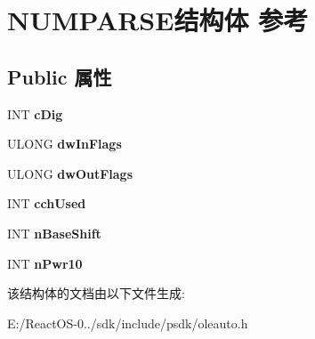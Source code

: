 \hypertarget{struct_n_u_m_p_a_r_s_e}{}\section{N\+U\+M\+P\+A\+R\+S\+E结构体 参考}
\label{struct_n_u_m_p_a_r_s_e}
\subsection*{Public 属性}
\begin{DoxyCompactItemize}
\item 
\mbox{\label{struct_n_u_m_p_a_r_s_e_a18a0067a72a24a10cb0d990ca38d32b3}} 
I\+NT {\bfseries c\+Dig}
\item 
\mbox{\label{struct_n_u_m_p_a_r_s_e_a1546311d2e3bb4151afda63001275095}} 
U\+L\+O\+NG {\bfseries dw\+In\+Flags}
\item 
\mbox{\label{struct_n_u_m_p_a_r_s_e_a3036f270883b0cde2b1e9618ca3a2b4a}} 
U\+L\+O\+NG {\bfseries dw\+Out\+Flags}
\item 
\mbox{\label{struct_n_u_m_p_a_r_s_e_a6fa556f8cb86c02e6e4ef2ee0c48295e}} 
I\+NT {\bfseries cch\+Used}
\item 
\mbox{\label{struct_n_u_m_p_a_r_s_e_a63ec9736b0b8fc8d2de83629c9f69055}} 
I\+NT {\bfseries n\+Base\+Shift}
\item 
\mbox{\label{struct_n_u_m_p_a_r_s_e_aadf82f1e8107ef6328642cfce68d1a07}} 
I\+NT {\bfseries n\+Pwr10}
\end{DoxyCompactItemize}


该结构体的文档由以下文件生成\+:\begin{DoxyCompactItemize}
\item 
E\+:/\+React\+O\+S-\/0../sdk/include/psdk/oleauto.\+h\end{DoxyCompactItemize}
